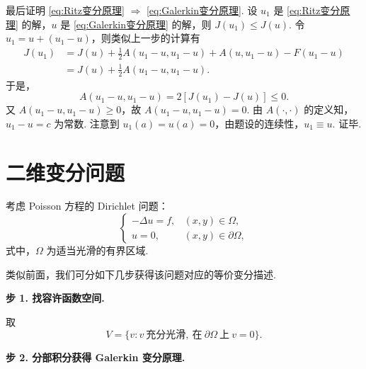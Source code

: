 \begin{sproof}
    最后证明 \eqref{eq:Ritz变分原理} $\Rightarrow$ \eqref{eq:Galerkin变分原理}. 设 $u_1$ 是 \eqref{eq:Ritz变分原理} 的解，$u$ 是 \eqref{eq:Galerkin变分原理} 的解，则 $J(u_1) \leq J(u)$. 令 $u_1 = u + (u_1 - u)$，则类似上一步的计算有
    \begin{align*}
        J(u_1) &= J(u) + \frac{1}{2}A(u_1-u, u_1-u) + A(u, u_1-u) - F(u_1-u) \\[-1pt]
        &= J(u) + \frac{1}{2}A(u_1-u, u_1-u).
    \end{align*}
    于是，
    \begin{equation*}
        A(u_1-u, u_1-u) = 2[J(u_1) - J(u)] \leq 0.
    \end{equation*}
    又 $A(u_1-u, u_1-u) \geq 0$，故 $A(u_1-u, u_1-u) = 0$. 由 $A(\cdot, \cdot)$ 的定义知，$u_1 - u = c$ 为常数. 注意到 $u_1(a) = u(a) = 0$，由题设的连续性，$u_1 \equiv u$. 证毕.
\end{sproof}


\section{二维变分问题}


考虑 Poisson 方程的 Dirichlet 问题：
\begin{equation}\label{eq:二维Poisson}
    \begin{cases}
        -\Delta u = f, & (x, y) \in \Omega, \\
        u = 0, & (x, y) \in \partial\Omega,
    \end{cases}
\end{equation}
式中，$\Omega$ 为适当光滑的有界区域.

类似前面，我们可分如下几步获得该问题对应的等价变分描述.

\noindent\textbf{步 1. 找容许函数空间.} 

取
\begin{equation*}
    V = \{ v : v\ \text{充分光滑},\ \text{在}\ \partial\Omega\ \text{上}\ v = 0 \}.
\end{equation*}

\noindent\textbf{步 2. 分部积分获得 Galerkin 变分原理.}

